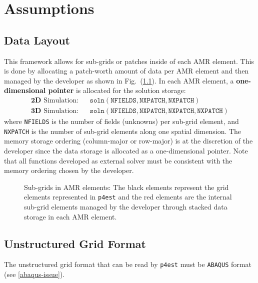 \documentclass[11pt]{book}
\begin{document}
\chapter{Assumptions}
\section{Data Layout}
This framework allows for sub-grids or patches inside of each AMR element.
This is done by allocating a patch-worth amount of data per AMR element and 
then managed by the developer as shown in Fig.~(\ref{subgrids}). In each AMR element, 
a \textbf{one-dimensional pointer} is allocated for the solution storage: 
\begin{eqnarray*}
\textbf{2D} \text{ Simulation}:&  &\texttt{soln}\left( \texttt{NFIELDS},\texttt{NXPATCH},\texttt{NXPATCH} \right) \\
\textbf{3D} \text{ Simulation}:&  &\texttt{soln}\left( \texttt{NFIELDS},\texttt{NXPATCH},\texttt{NXPATCH},\texttt{NXPATCH} \right)
\end{eqnarray*}
where \texttt{NFIELDS} is the number of fields (unknowns) per sub-grid element, 
and \texttt{NXPATCH} is the number of sub-grid elements along one spatial dimension. 
The memory storage ordering (column-major or row-major) is at the discretion of the developer 
since the data storage is allocated as a one-dimensional pointer. Note that all functions developed 
as external solver must be consistent with the memory ordering chosen by the developer.

\begin{figure}[h]
 \begin{subfigmatrix}{4}%
  \subfigure{}
    \subfigure{}
 \end{subfigmatrix}
 \caption{Sub-grids in AMR elements: The black elements represent the grid elements represented in \texttt{p4est} 
 and the red elements are the internal sub-grid elements managed by the developer through stacked data storage in each 
 AMR element.}
 \label{subgrids}
\end{figure}

\section{Unstructured Grid Format}
The unstructured grid format that can be read by \texttt{p4est} must be \texttt{ABAQUS} format (see \ref{abaqus-issue}).
\end{document}
